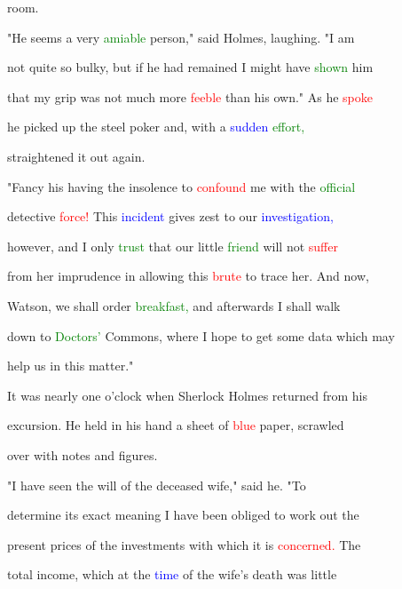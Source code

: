  room.



 "He seems a very \textcolor{green}{amiable} person," said Holmes, \textcolor{BurntOrange}{laughing.} "I am

 not quite so bulky, but if he had remained I might have \textcolor{green}{shown} him

 that my grip was not much more \textcolor{red}{feeble} than his own." As he \textcolor{red}{spoke}

 he picked up the steel poker and, with a \textcolor{blue}{sudden} \textcolor{green}{effort,}

 straightened it out again.



 \textcolor{BurntOrange}{"Fancy} his having the insolence to \textcolor{red}{confound} me with the \textcolor{green}{official}

 detective \textcolor{red}{force!} This \textcolor{blue}{incident} gives \textcolor{BurntOrange}{zest} to our \textcolor{blue}{investigation,}

 however, and I only \textcolor{green}{trust} that our little \textcolor{green}{friend} will not \textcolor{red}{suffer}

 from her imprudence in allowing this \textcolor{red}{brute} to trace her. And now,

 Watson, we shall order \textcolor{green}{breakfast,} and afterwards I shall walk

 down to \textcolor{green}{Doctors'} Commons, where I \textcolor{BurntOrange}{hope} to get some data which may

 help us in this matter."





 It was nearly one o'clock when Sherlock Holmes returned from his

 excursion. He held in his hand a sheet of \textcolor{red}{blue} paper, scrawled

 over with notes and figures.



 "I have seen the will of the deceased wife," said he. "To

 determine its exact meaning I have been \textcolor{BurntOrange}{obliged} to work out the

 \textcolor{BurntOrange}{present} prices of the investments with which it is \textcolor{red}{concerned.} The

 total \textcolor{BurntOrange}{income,} which at the \textcolor{blue}{time} of the wife's \textcolor{BurntOrange}{death} was little

